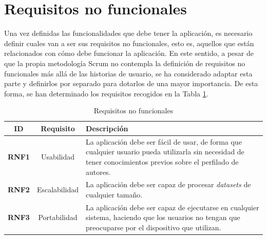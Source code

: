 \section{Requisitos no funcionales}
\label{sec:analisis_requisitos_no_funcionales}

Una vez definidas las funcionalidades que debe tener la aplicación, es necesario definir cuales van a ser sus requisitos
no funcionales, esto es, aquellos que están relacionados con cómo debe funcionar la aplicación. En este sentido, a pesar
de que la propia metodología Scrum no contempla la definición de requisitos no funcionales más allá de las historias de usuario,
se ha considerado adaptar esta parte y definirlos por separado para dotarlos de una mayor importancia.
De esta forma, se han determinado los requisitos recogidos en la Tabla \ref{tab:requisitos_no_funcionales}.

\bigskip
\begin{table}[hp!]
	\centering
	\begin{tabular}{|c|c|p{7.5cm}|}
		\rowcolor{udcpink!25}
		\hline
		\small \textbf{ID}                    & \small \textbf{Requisito} & \small \textbf{Descripción}                                                                      \\\hline
		\small \textbf{RNF1} \label{req:rnf1} & \small Usabilidad         & \small La aplicación debe ser fácil de usar, de forma que cualquier usuario pueda utilizarla sin
		necesidad de tener conocimientos previos sobre el perfilado de autores.                                                                                              \\\hline
		\small \textbf{RNF2} \label{req:rnf2} & \small Escalabilidad      & \small La aplicación debe ser capaz de procesar \textit{datasets} de cualquier tamaño.           \\\hline
		\small \textbf{RNF3} \label{req:rnf3} & \small Portabilidad       & \small La aplicación debe ser capaz de ejecutarse en cualquier sistema, haciendo que
		los usuarios no tengan que preocuparse por el dispositivo que utilizan.                                                                                              \\\hline
	\end{tabular}
	\caption{Requisitos no funcionales}
	\label{tab:requisitos_no_funcionales}
\end{table}
